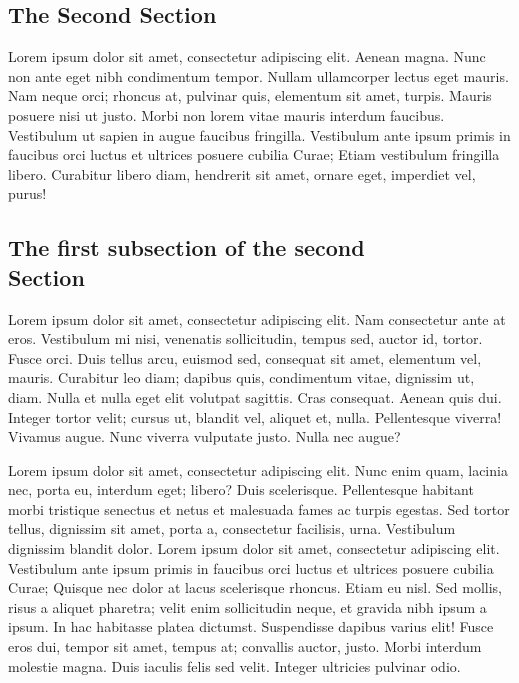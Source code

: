 \documentclass[a4paper,10pt]{article}
\begin{document}
\begin{multicols}{2}
\section{The Second Section}

Lorem ipsum dolor sit amet, consectetur adipiscing elit.  Aenean magna. Nunc non
ante eget nibh condimentum tempor. Nullam ullamcorper lectus eget mauris. Nam
neque orci; rhoncus at, pulvinar quis, elementum sit amet, turpis. Mauris
posuere nisi ut justo. Morbi non lorem vitae mauris interdum faucibus.
Vestibulum ut sapien in augue faucibus fringilla. Vestibulum ante ipsum primis
in faucibus orci luctus et ultrices posuere cubilia Curae; Etiam vestibulum
fringilla libero. Curabitur libero diam, hendrerit sit amet, ornare eget,
imperdiet vel, purus!


\subsection{The first subsection of the second \\ Section}

Lorem ipsum dolor sit amet, consectetur adipiscing elit. Nam consectetur ante at
eros. Vestibulum mi nisi, venenatis sollicitudin, tempus sed, auctor id, tortor.
Fusce orci. Duis tellus arcu, euismod sed, consequat sit amet, elementum vel,
mauris. Curabitur leo diam; dapibus quis, condimentum vitae, dignissim ut, diam.
Nulla et nulla eget elit volutpat sagittis. Cras consequat. Aenean quis dui.
Integer tortor velit; cursus ut, blandit vel, aliquet et, nulla. Pellentesque
viverra! Vivamus augue. Nunc viverra vulputate justo. Nulla nec augue?

Lorem ipsum dolor sit amet, consectetur adipiscing elit. Nunc enim quam, lacinia
nec, porta eu, interdum eget; libero? Duis scelerisque. Pellentesque habitant
morbi tristique senectus et netus et malesuada fames ac turpis egestas. Sed
tortor tellus, dignissim sit amet, porta a, consectetur facilisis, urna.
Vestibulum dignissim blandit dolor. Lorem ipsum dolor sit amet, consectetur
adipiscing elit. Vestibulum ante ipsum primis in faucibus orci luctus et
ultrices posuere cubilia Curae; Quisque nec dolor at lacus scelerisque rhoncus.
Etiam eu nisl. Sed mollis, risus a aliquet pharetra; velit enim sollicitudin
neque, et gravida nibh ipsum a ipsum. In hac habitasse platea dictumst.
Suspendisse dapibus varius elit! Fusce eros dui, tempor sit amet, tempus at;
convallis auctor, justo. Morbi interdum molestie magna. Duis iaculis felis sed
velit. Integer ultricies pulvinar odio.


\end{multicols}
\end{document}
